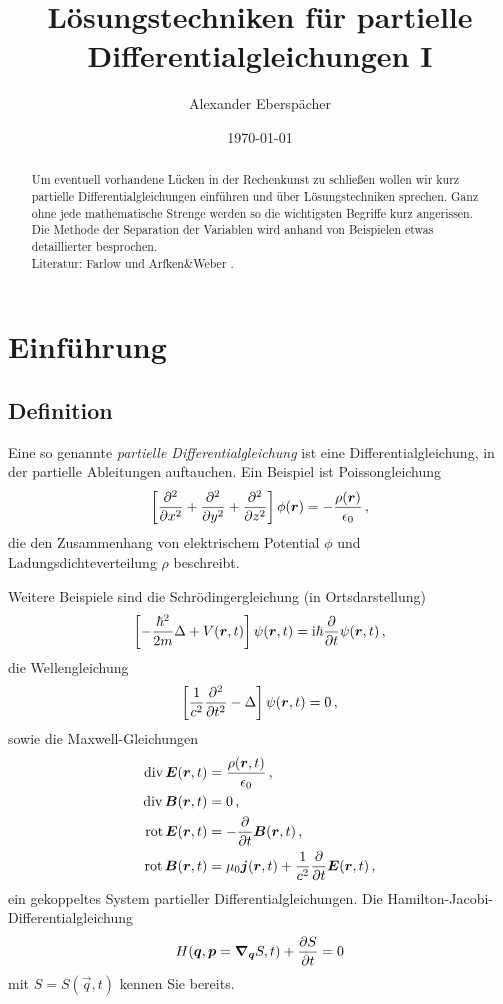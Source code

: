 \documentclass[paper=a4, fontsize=11.0pt, abstractoff, DIV12]{scrartcl}
\title{Lösungstechniken für partielle Differentialgleichungen I}
\author{Alexander Eberspächer}
\date{\today}
\begin{document}
\maketitle
\begin{abstract}
Um eventuell vorhandene Lücken in der Rechenkunst zu schließen wollen wir kurz
partielle Differentialgleichungen einführen und über Lösungstechniken sprechen.
Ganz ohne jede mathematische Strenge werden so die wichtigsten Begriffe kurz
angerissen. Die Methode der Separation der Variablen wird anhand von Beispielen
etwas detaillierter besprochen.\\[0.5ex]
Literatur: Farlow \cite{Farlow} und Arfken\&Weber \cite{Arfken}.
\end{abstract}

\section{Einführung}

\subsection{Definition}

Eine so genannte \emph{partielle Differentialgleichung} ist eine
Differentialgleichung, in der partielle Ableitungen auftauchen. Ein Beispiel ist
Poissongleichung
\begin{equation}
\left[\frac{\partial^2 }{\partial {x}^2} + \frac{\partial^2 }{\partial {y}^2} + \frac{\partial^2 }{\partial {z}^2}\right] \phi({\boldsymbol{r}}) = -\frac{\rho({\boldsymbol{r}})}{\epsilon_0}\, ,
\label{eq:Poisson}
\end{equation}
die den Zusammenhang von elektrischem Potential $\phi$ und Ladungsdichteverteilung
$\rho$ beschreibt.

Weitere Beispiele sind die Schrödingergleichung (in Ortsdarstellung)
\begin{equation}
\left[-\frac{\hbar^2}{2m} \Delta + V({\boldsymbol{r}}, t)\right]\psi({\boldsymbol{r}}, t) = \mathrm{i} \hbar\frac{\partial }{\partial t}\psi({\boldsymbol{r}}, t)\,,
\label{eq:SGL}
\end{equation}
die Wellengleichung
\begin{equation}
\left[\frac{1}{c^2}\frac{\partial^2 }{\partial {t}^2} - \Delta\right]\psi({\boldsymbol{r}}, t) = 0\,,
\end{equation}
sowie die Maxwell-Gleichungen
\begin{align}
\operatorname{div} {\boldsymbol{E}}({\boldsymbol{r}}, t) &= \frac{\rho({\boldsymbol{r}}, t)}{\epsilon_0}\,,\\
\operatorname{div} {\boldsymbol{B}}({\boldsymbol{r}}, t) &= 0\,,\\
\operatorname{rot} {\boldsymbol{E}}({\boldsymbol{r}}, t) &= -\frac{\partial }{\partial t}{\boldsymbol{B}}({\boldsymbol{r}}, t)\,,\\
\operatorname{rot} {\boldsymbol{B}}({\boldsymbol{r}}, t) &= \mu_0 {\boldsymbol{j}}({\boldsymbol{r}}, t) + \frac{1}{c^2}\frac{\partial }{\partial t}{\boldsymbol{E}}({\boldsymbol{r}}, t)\,,
\end{align}
ein gekoppeltes System partieller Differentialgleichungen. Die
Hamilton-Jacobi-Differentialgleichung
\begin{equation}
H(\vec q, \vec p=\nabla_{\vec q} S, t) + \firstpderiv{S}{t} = 0
\label{eq:HJ}
\end{equation}
mit $S=S(\vec q, t)$ kennen Sie bereits.
\end{document}
